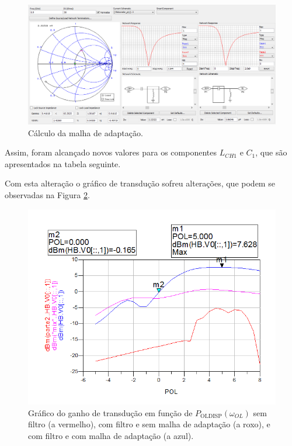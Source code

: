 \documentclass[11pt]{article}
\numberwithin{equation}{section}
\begin{document}
\begin{figure}[h]
\centering
\includegraphics[keepaspectratio=true, scale=0.50]{exps/M_adapt}
\vspace{-0.5em}
\caption{Cálculo da malha de adaptação.}
\vspace{-0.8em}
\label{fig:M_adapt}
\end{figure}

Assim, foram alcançado novos valores para os componentes $L_{CH1}$ e $C_{1}$, que são apresentados na tabela seguinte.

 

Com esta alteração o gráfico de transdução sofreu alterações, que podem se observadas na Figura \ref{fig:GT_21}.

\begin{figure}[h]
\centering
\includegraphics[keepaspectratio=true, scale=0.45]{exps/GT_21}
\vspace{-0.5em}
\caption{Gráfico do ganho de transdução em função de $ P_{\text{OLDISP}}\left(\omega_{OL}\right) $ sem filtro (a vermelho), com filtro e sem malha de adaptação (a roxo), e com filtro e com malha de adaptação (a azul).}
\vspace{-0.8em}
\label{fig:GT_21}
\end{figure}
\end{document}
